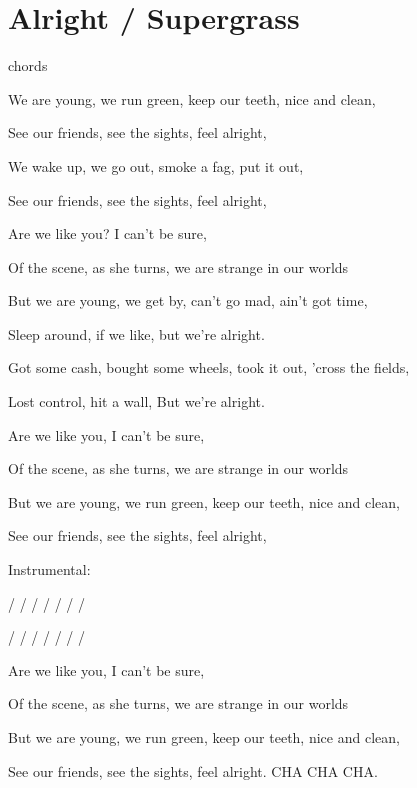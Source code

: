\section{Alright / Supergrass}\label{sec:alright}
  {\small chords}
  
  \Eminor
  \FsharpMinor
  \Fmajor
  \Amajor
  \Gmajor
  
  We are young, we run green, keep our teeth, nice and clean,
  
  See our friends, see the sights, feel alright,
  
  We wake up, we go out, smoke a fag, put it out,
  
  See our friends, see the sights, feel alright,
  
  Are we like you? I can't be sure,
  
  Of the scene, as she turns, we are strange in our worlds
  
  But we are young, we get by, can't go mad, ain't got time,
  
  Sleep around, if we like, but we're alright.
  
  Got some cash, bought some wheels, took it out, 'cross the fields,
  
  Lost control, hit a wall, But we're alright.
  
  Are we like you, I can't be sure,
  
  Of the scene, as she turns, we are strange in our worlds
  
  But we are young, we run green, keep our teeth, nice and clean,
  
  See our friends, see the sights, feel alright,
  
  Instrumental:
  
   /  /  /  /  /  /  / 
  
   /  /  /  /  /  /  / 
  
  Are we like you, I can't be sure,
  
  Of the scene, as she turns, we are strange in our worlds
  
  But we are young, we run green, keep our teeth, nice and clean,
  
  See our friends, see the sights, feel alright. CHA CHA CHA.
